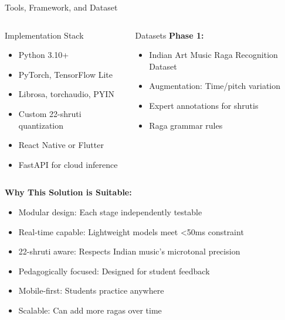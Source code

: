 \documentclass[aspectratio=169,11pt]{beamer}
\begin{document}
	\begin{frame}{Tools, Framework, and Dataset}
		
		\begin{columns}
			\begin{block}{Implementation Stack}
				\begin{itemize}
					\footnotesize
					\item Python 3.10+
					\item PyTorch, TensorFlow Lite
					\item Librosa, torchaudio, PYIN
					\item Custom 22-shruti quantization
					\item React Native or Flutter
					\item FastAPI for cloud inference
				\end{itemize}
			\end{block}
			
			\begin{block}{Datasets}
				\textbf{Phase 1:}
				\begin{itemize}
					\footnotesize
					\item Indian Art Music Raga Recognition Dataset
					\item Augmentation: Time/pitch variation
					\item Expert annotations for shrutis
					\item Raga grammar rules
				\end{itemize}
			\end{block}
		\end{columns}
		
		\vspace{0.3cm}
		
		\textbf{Why This Solution is Suitable:}
		\begin{itemize}
			\footnotesize
			\item Modular design: Each stage independently testable
			\item Real-time capable: Lightweight models meet <50ms constraint
			\item 22-shruti aware: Respects Indian music's microtonal precision
			\item Pedagogically focused: Designed for student feedback
			\item Mobile-first: Students practice anywhere
			\item Scalable: Can add more ragas over time
		\end{itemize}
	\end{frame}
	
\end{document}
